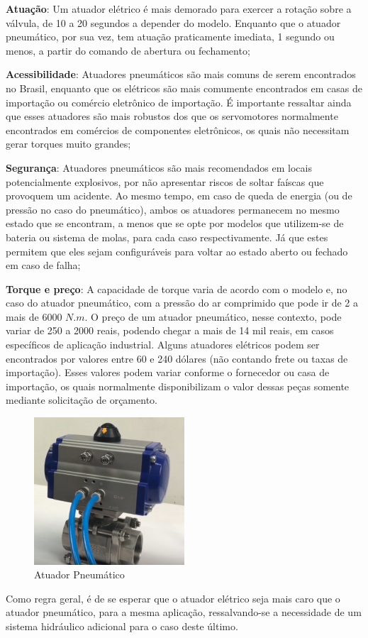 \par \textbf{Atuação}: Um atuador elétrico é mais demorado para exercer a rotação sobre a válvula, de 10 a 20 segundos a depender do modelo. Enquanto que o atuador pneumático, por sua vez, tem atuação praticamente imediata, 1 segundo ou menos, a partir do comando de abertura ou fechamento;

\par \textbf{Acessibilidade}: Atuadores pneumáticos são mais comuns de serem encontrados no Brasil, enquanto que os elétricos são mais comumente encontrados em casas de importação ou comércio eletrônico de importação. É importante ressaltar ainda que esses atuadores são mais robustos dos que os servomotores normalmente encontrados em comércios de componentes eletrônicos, os quais não necessitam gerar torques muito grandes;

\par \textbf{Segurança}: Atuadores pneumáticos são mais recomendados em locais potencialmente explosivos, por não apresentar riscos de soltar faíscas que provoquem um acidente. Ao mesmo tempo, em caso de queda de energia (ou de pressão no caso do pneumático), ambos os atuadores permanecem no mesmo estado que se encontram, a menos que se opte por modelos que utilizem-se de bateria ou sistema de molas, para cada caso respectivamente. Já que estes permitem que eles sejam configuráveis para voltar ao estado aberto ou fechado em caso de falha;

\par \textbf{Torque e preço}: A capacidade de torque varia de acordo com o modelo e, no caso do atuador pneumático, com a pressão do ar comprimido que pode ir de 2 a mais de 6000 $N.m$. O preço de um atuador pneumático, nesse contexto, pode variar de 250 a 2000 reais, podendo chegar a mais de 14 mil reais, em casos específicos de aplicação industrial. Alguns atuadores elétricos podem ser encontrados por valores entre 60 e 240 dólares (não contando frete ou taxas de importação). Esses valores podem variar conforme o fornecedor ou casa de importação, os quais normalmente disponibilizam o valor dessas peças somente mediante solicitação de orçamento.

\begin{figure}[!h]
\centering
\includegraphics[width=0.5\textwidth]{figuras/atuadorPneumatico.png}
\caption{Atuador Pneumático}
\label{fig:atuador pneumatico}
\end{figure}

\par Como regra geral, é de se esperar que o atuador elétrico seja mais caro que o atuador pneumático, para a mesma aplicação, ressalvando-se a necessidade de um sistema hidráulico adicional para o caso deste último.